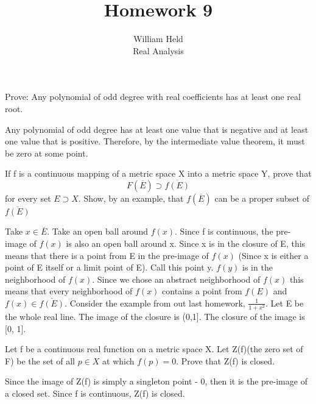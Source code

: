 \documentclass[12pt]{article}
\newenvironment{exercise}[2][Exercise]{\begin{trivlist}
\item[\hskip \labelsep {\bfseries #1}\hskip \labelsep {\bfseries #2.}]}{\end{trivlist}}
\begin{document}
 
 
 
\title{Homework 9}%
\author{William Held\\ %
Real Analysis} %

\newcommand{\norm}[1]{\left\lVert#1\right\rVert}
\newcommand{\abs}[1]{|#1|}
\newcommand{\ceil}[1]{\left \lceil #1 \right \rceil }
\newcommand{\floor}[1]{\left \lfloor #1 \right \rfloor }
\let\biconditional\leftrightarrow
\maketitle

\begin{exercise}{1.1}
Prove: Any polynomial of odd degree with real coefficients has at least one real root.
\end{exercise}
Any polynomial of odd degree has at least one value that is negative and at least one value that is positive. Therefore, by the intermediate value theorem, it must be zero at some point.

\begin{exercise}{R4.2}
If f is a continuous mapping of a metric space X into a metric space Y, prove that $$F(\overline{E}) \supset \overline{f(E)}$$
for every set $E \supset X$. Show, by an example, that $f(\overline{E})$ can be a proper subset of $\overline{f(E)}$
\end{exercise}
Take $x\in\overline{E}$. Take an open ball around $f(x)$. Since f is continuous, the pre-image of $f(x)$ is also an open ball around x. Since x is in the closure of E, this means that there is a point from E in the pre-image of $f(x)$ (Since x is either a point of E itself or a limit point of E). Call this point y. $f(y)$ is in the neighborhood of $f(x)$. Since we chose an abstract neighborhood of $f(x)$ this means that every neighborhood of $f(x)$ contains a point from $f(E)$ and $f(x) \in \overline{f(E)}$. Consider the example from out last homework, $\frac{1}{1+x^2}$. Let E be the whole real line. The image of the closure is (0,1]. The closure of the image is [0, 1].

\begin{exercise}{R4.3}
Let f be a continuous real function on a metric space X. Let Z(f)(the zero set of F) be the set of all $p\in X$ at which $f(p)=0$. Prove that Z(f) is closed.
\end{exercise}
Since the image of Z(f) is simply a singleton point - 0, then it is the pre-image of a closed set. Since f is continuous, Z(f) is closed. 
\end{document}
